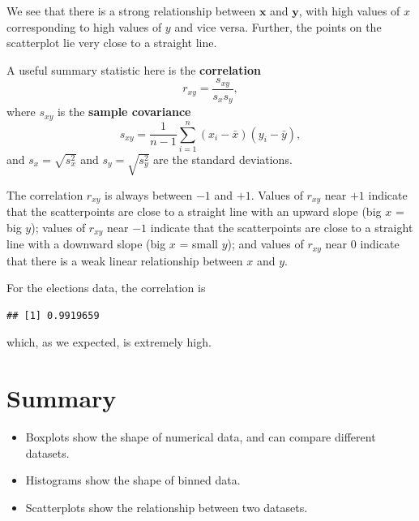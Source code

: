 \documentclass[
  a4paper,
]{book}
\newenvironment{Shaded}{\begin{snugshade}}{\end{snugshade}}
\newcommand{\FunctionTok}[1]{\textcolor[rgb]{0.00,0.00,0.00}{#1}}
\newcommand{\NormalTok}[1]{#1}
\newcommand{\SpecialCharTok}[1]{\textcolor[rgb]{0.00,0.00,0.00}{#1}}
\providecommand{\tightlist}{%
  \setlength{\itemsep}{0pt}\setlength{\parskip}{0pt}}
\theoremstyle{definition}
\theoremstyle{definition}
\theoremstyle{definition}
\theoremstyle{definition}
\theoremstyle{remark}
\begin{document}
We see that there is a strong relationship between \(\mathbf x\) and \(\mathbf y\), with high values of \(x\) corresponding to high values of \(y\) and vice versa. Further, the points on the scatterplot lie very close to a straight line.

A useful summary statistic here is the \textbf{correlation}
\[ r_{xy} = \frac{s_{xy}}{s_x s_y} , \]
where \(s_{xy}\) is the \textbf{sample covariance}
\[ s_{xy} = \frac{1}{n-1} \sum_{i=1}^n (x_i - \bar x)(y_i - \bar y) , \]
and \(s_x = \sqrt{s_x^2}\) and \(s_y = \sqrt{s_y^2}\) are the standard deviations.

The correlation \(r_{xy}\) is always between \(-1\) and \(+1\). Values of \(r_{xy}\) near \(+1\) indicate that the scatterpoints are close to a straight line with an upward slope (big \(x\) = big \(y\)); values of \(r_{xy}\) near \(-1\) indicate that the scatterpoints are close to a straight line with a downward slope (big \(x\) = small \(y\)); and values of \(r_{xy}\) near 0 indicate that there is a weak linear relationship between \(x\) and \(y\).

For the elections data, the correlation is

\begin{Shaded}
\end{Shaded}

\begin{verbatim}
## [1] 0.9919659
\end{verbatim}

which, as we expected, is extremely high.

\hypertarget{summary-02}{%
\section*{Summary}\label{summary-02}}

\begin{itemize}
\tightlist
\item
  Boxplots show the shape of numerical data, and can compare different datasets.
\item
  Histograms show the shape of binned data.
\item
  Scatterplots show the relationship between two datasets.
\end{itemize}
\end{document}
